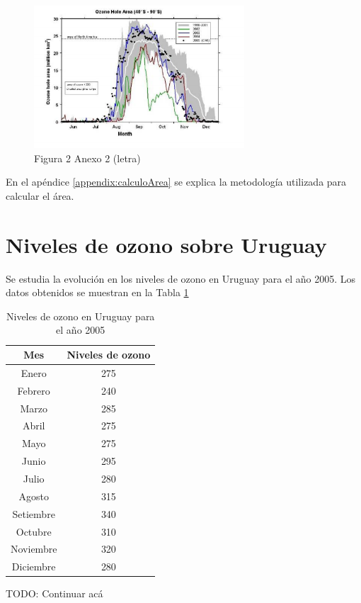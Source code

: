 \documentclass[a4paper]{article}
\begin{document}
\begin{figure}[ht]
\centering
\includegraphics[width=0.7\textwidth]{assets/letra_fig2.png}
\caption{\label{fig:letra_fig2}Figura 2 Anexo 2 (letra)}
\end{figure}

En el apéndice \ref{appendix:calculoArea} se explica la metodología utilizada para calcular el área.

\newpage
\section{Niveles de ozono sobre Uruguay}
\label{section:parte3}

Se estudia la evolución en los niveles de ozono en Uruguay para el año 2005. Los datos obtenidos se muestran en la Tabla \ref{table:uy2005}

\begin{table}[ht]
\centering
\begin{tabular}{c | c}
Mes & Niveles de ozono \\\hline
Enero & 275\\
Febrero & 240\\
Marzo & 285 \\
Abril & 275\\
Mayo & 275\\
Junio & 295\\
Julio & 280\\
Agosto & 315\\  
Setiembre & 340\\
Octubre & 310\\
Noviembre & 320\\
Diciembre  & 280\\
\end{tabular}
\caption{\label{table:uy2005}Niveles de ozono en Uruguay para el año 2005}
\end{table}


TODO: Continuar acá
\end{document}
